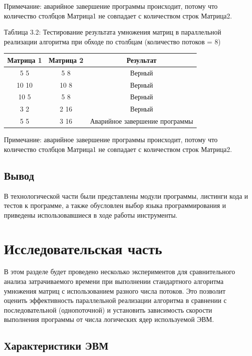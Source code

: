 \documentclass[12pt]{report}
\begin{document}
Примечание: аварийное завершение программы происходит, потому что количество столбцов Матрица1 не совпадает с количеством строк Матрица2.

\begin{center}
	\centering
	\caption{Таблица 3.2: Тестирование результата умножения матриц в параллельной реализации алгоритма при обходе по столбцам (количество потоков = 8)}
	\begin{tabular}{|c c c|}
		\hline
		Матрица 1 & Матрица 2 &  Результат \\ [0.5ex] 
 		\hline\hline
		5 5 & 5 8 & Верный\\
 		\hline
 		10 10 & 10 8 & Верный\\
		\hline
		10 5 & 5 8 & Верный\\
 		\hline
 		 3 2 & 2 16 & Верный\\
 		\hline
		5 5 & 3 16 & Аварийное завершение программы\\
		\hline
	\end{tabular}
\end{center} 

Примечание: аварийное завершение программы происходит, потому что количество столбцов Матрица1 не совпадает с количеством строк Матрица2.


\section{Вывод}
В технологической части были представлены модули программы, листинги кода и тестов к программе, а также обусловлен выбор языка программирования и приведены использовавшиеся в ходе работы инструменты.

\chapter{Исследовательская часть}

В этом разделе будет проведено несколько экспериментов для сравнительного анализа затрачиваемого времени при выполнении стандартного алгоритма умножения матриц с использованием разного числа потоков. Это позволит оценить эффективность параллельной реализации алгоритма в сравнении с последовательной (однопоточной) и установить зависимость скорости выполнения программы от числа логических ядер используемой ЭВМ.

\section{Характеристики ЭВМ}
\end{document}
